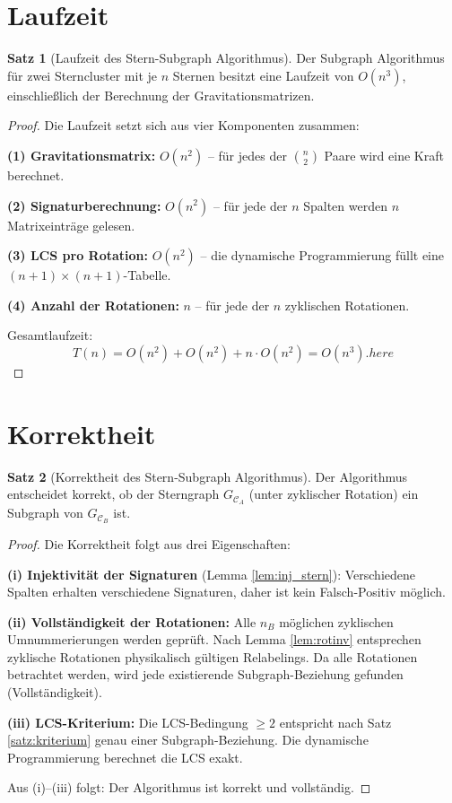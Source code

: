 ﻿\documentclass[a4paper,12pt]{report}
\theoremstyle{definition}
\newtheorem{satz}{Satz}
\begin{document}
\section{Laufzeit}

\begin{satz}[Laufzeit des Stern-Subgraph Algorithmus]
\label{satz:laufzeit}
Der Subgraph Algorithmus für zwei Sterncluster mit je $n$ Sternen besitzt eine Laufzeit von $O(n^3)$, einschließlich der Berechnung der Gravitationsmatrizen.
\end{satz}

\begin{proof}
Die Laufzeit setzt sich aus vier Komponenten zusammen:

\textbf{(1) Gravitationsmatrix:} $O(n^2)$ -- für jedes der $\binom{n}{2}$ Paare wird eine Kraft berechnet.

\textbf{(2) Signaturberechnung:} $O(n^2)$ -- für jede der $n$ Spalten werden $n$ Matrixeinträge gelesen.

\textbf{(3) LCS pro Rotation:} $O(n^2)$ -- die dynamische Programmierung füllt eine $(n+1) \times (n+1)$-Tabelle.

\textbf{(4) Anzahl der Rotationen:} $n$ -- für jede der $n$ zyklischen Rotationen.

Gesamtlaufzeit:
\[
T(n) = O(n^2) + O(n^2) + n \cdot O(n^2) = O(n^3).here
\]
\end{proof}

\section{Korrektheit}

\begin{satz}[Korrektheit des Stern-Subgraph Algorithmus]
\label{satz:korrekt}
Der Algorithmus entscheidet korrekt, ob der Sterngraph $G_{\mathcal{C}_A}$ (unter zyklischer Rotation) ein Subgraph von $G_{\mathcal{C}_B}$ ist.
\end{satz}

\begin{proof}
Die Korrektheit folgt aus drei Eigenschaften:

\textbf{(i) Injektivität der Signaturen} (Lemma \ref{lem:inj_stern}): Verschiedene Spalten erhalten verschiedene Signaturen, daher ist kein Falsch-Positiv möglich.

\textbf{(ii) Vollständigkeit der Rotationen:} Alle $n_B$ möglichen zyklischen Umnummerierungen werden geprüft. Nach Lemma \ref{lem:rotinv} entsprechen zyklische Rotationen physikalisch gültigen Relabelings. Da alle Rotationen betrachtet werden, wird jede existierende Subgraph-Beziehung gefunden (Vollständigkeit).

\textbf{(iii) LCS-Kriterium:} Die LCS-Bedingung $\geq 2$ entspricht nach Satz \ref{satz:kriterium} genau einer Subgraph-Beziehung. Die dynamische Programmierung berechnet die LCS exakt.

Aus (i)--(iii) folgt: Der Algorithmus ist korrekt und vollständig.
\end{proof}
\end{document}
